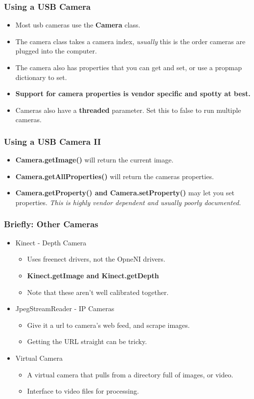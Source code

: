 \documentclass[compress]{beamer}
\begin{document}
\begin{frame}
\frametitle{Using a USB Camera}
\begin{itemize}
\item Most usb cameras use the \textbf{Camera} class. 
\item The camera class takes a camera index, \emph{usually} this is the
   order cameras are plugged into the computer.
\item The camera also has properties that you can get and set, or use a propmap dictionary to set. 
 \item \textbf{Support for camera properties is vendor specific and spotty at
   best.} 
 \item Cameras also have a \textbf{threaded} parameter. Set this to false
 to run multiple cameras. 
\end{itemize}
\end{frame}
\begin{frame}
\frametitle{Using a USB Camera II}
\begin{itemize}
\item \textbf{Camera.getImage()} will return the current image. 
\item \textbf{Camera.getAllProperties()} will return the cameras properties.
\item \textbf{Camera.getProperty() and Camera.setProperty()} may let
  you set properties. \emph{This is highly vendor dependent and usually poorly documented.}
\end{itemize}
\end{frame}
\begin{frame}
\frametitle{Briefly: Other Cameras}
\begin{itemize}
\item Kinect - Depth Camera
\begin{itemize}
\item Uses freenect drivers, not the OpneNI drivers.
\item \textbf{Kinect.getImage and Kinect.getDepth }
\item Note that these aren't well calibrated together.
\end{itemize}
\item JpegStreamReader - IP Cameras
\begin{itemize}
\item Give it a url to camera's web feed, and scrape images.
\item Getting the URL straight can be tricky. 
\end{itemize}
\item Virtual Camera
\begin{itemize}
\item A virtual camera that pulls from a directory full of images, or video.
\item Interface to video files for processing.
\end{itemize}
\end{itemize}
\end{frame}
\end{document}
